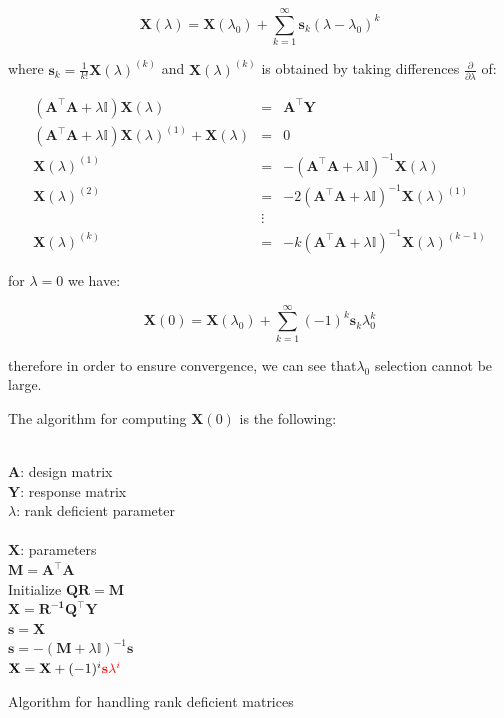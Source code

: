 \begin{equation}
\label{eq:taylor}
    \mathbf{X}(\lambda)=\mathbf{X}(\lambda_0) + \sum_{k=1}^\infty
    \mathbf{s}_k(\lambda-\lambda_0)^{k}
\end{equation}


\noindent where $\mathbf{s}_k=\frac{1}{k!}\mathbf{X}(\lambda)^{(k)}$
and $\mathbf{X}(\lambda)^{(k)}$ is obtained by taking differences 
$\frac{\partial}{\partial \lambda}$ of:  

\begin{eqnarray*}
(\mathbf{A}^\top \mathbf{A}+ \lambda\mathbb{I}) \mathbf{X}(\lambda) & = & \mathbf{A}^\top \mathbf{Y}\\
(\mathbf{A}^\top \mathbf{A}+ \lambda\mathbb{I}) \mathbf{X}(\lambda)^{(1)} + \mathbf{X}(\lambda)& = & 0 \\
\mathbf{X}(\lambda)^{(1)}  &=& -(\mathbf{A}^\top \mathbf{A}+ \lambda\mathbb{I}) ^{-1} \mathbf{X}(\lambda) \\
\mathbf{X}(\lambda)^{(2)}  &=& -2(\mathbf{A}^\top \mathbf{A}+ \lambda\mathbb{I}) ^{-1} \mathbf{X}(\lambda)^{(1)} \\
& \vdots & \\
\mathbf{X}(\lambda)^{(k)}  &=& -k(\mathbf{A}^\top \mathbf{A}+ \lambda\mathbb{I}) ^{-1} \mathbf{X}(\lambda)^{(k-1)} 
\end{eqnarray*}



\noindent for $\lambda=0$ we have:

\begin{equation}
\label{eq:taylor}
    \mathbf{X}(0)=\mathbf{X}(\lambda_0) + \sum_{k=1}^\infty
     (-1)^k \mathbf{s}_k \lambda_0^k
\end{equation}


\noindent therefore in order to ensure convergence, we can see that$\lambda_0$
selection cannot be large. 

The algorithm for computing $\mathbf{X}(0)$ is the following:

\begin{algorithm}[H]
\begin{algorithmic}[1]
\REQUIRE $\,$ \\
$\mathbf{A}$: design matrix \\
$\mathbf{Y}$: response matrix \\
$\lambda$: rank deficient parameter \\
\ENSURE  $\,$ \\
$\mathbf{X}$: parameters \\
\STATE $\mathbf{M}=\mathbf{A^\top A}$ \\
\STATE Initialize $\mathbf{Q R}=\mathbf{M}$ \\
\STATE $\mathbf{X} = \mathbf{R^{-1}Q^\top Y}$ \\
\STATE $\mathbf{s} = \mathbf{X}$ \\
	\STATE $\mathbf{s} =
        -(\mathbf{M}+\lambda\mathbb{I})^{-1}\mathbf{s}$\\
	\STATE $\mathbf{X}=\mathbf{X} + (-1)^i {\color{red}\mathbf{s}
        \lambda^i}$
\ENDFOR
\end{algorithmic}
\caption{Algorithm for handling rank deficient matrices}
\label{alg:coleman}
\end{algorithm}

